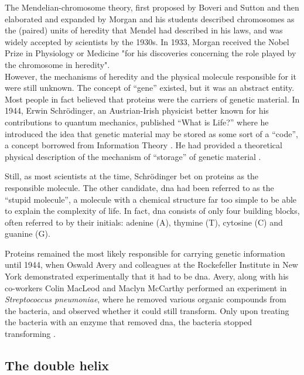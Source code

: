 The Mendelian-chromosome theory, first proposed by Boveri and Sutton \cite{sutton1903chromosomes} and then elaborated and expanded by Morgan and his students \cite{morgan1915mechanism} described chromosomes as the (paired) units of heredity that Mendel had described in his laws, and was widely accepted by scientists by the 1930s. 
In 1933, Morgan received the Nobel Prize in Physiology or Medicine "for his discoveries concerning the role played by the chromosome in heredity".\\

However, the mechanisms of heredity and the physical molecule responsible for it were still unknown. 
The concept of “gene” existed, but it was an abstract entity. 
Most people in fact believed that proteins were the carriers of genetic material. 
In 1944, Erwin  Schrödinger, an Austrian-Irish physicist better known for his contributions to quantum mechanics, published “What is Life?” where he introduced the idea that genetic material may be stored as some sort of a “code”, a concept borrowed from Information Theory \cite{schrodinger1944what}. 
He had provided a theoretical physical description of the mechanism of “storage” of genetic material \cite{mukherjee2016gene}.

Still, as most scientists at the time, Schrödinger bet on proteins as the responsible molecule. 
The other candidate, \gls{dna} had been referred to as the “stupid molecule”, a molecule with a chemical structure far too simple to be able to explain the complexity of life. 
In fact, \gls{dna} consists of only four building blocks, often referred to by their initials: adenine (A), thymine (T), cytosine (C) and guanine (G).

Proteins remained the most likely responsible for carrying genetic information until 1944, when Oswald Avery and colleagues at the Rockefeller Institute in New York demonstrated experimentally that it had to be \gls{dna}. 
Avery, along with his co-workers Colin MacLeod and Maclyn McCarthy performed an experiment in \textit{Streptococcus pneumoniae}, where he removed various organic compounds from the bacteria, and observed whether it could still transform. 
Only upon treating the bacteria with an enzyme that removed \gls{dna}, the bacteria stopped transforming \cite{avery1944studies}.


\subsection{The double helix} %

